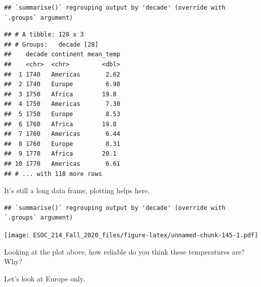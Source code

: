 \documentclass[
]{book}
\newenvironment{Shaded}{\begin{snugshade}}{\end{snugshade}}
\newcommand{\DataTypeTok}[1]{\textcolor[rgb]{0.13,0.29,0.53}{#1}}
\newcommand{\KeywordTok}[1]{\textcolor[rgb]{0.13,0.29,0.53}{\textbf{#1}}}
\newcommand{\NormalTok}[1]{#1}
\newcommand{\OperatorTok}[1]{\textcolor[rgb]{0.81,0.36,0.00}{\textbf{#1}}}
\newcommand{\OtherTok}[1]{\textcolor[rgb]{0.56,0.35,0.01}{#1}}
\newcommand{\StringTok}[1]{\textcolor[rgb]{0.31,0.60,0.02}{#1}}
\begin{document}
\begin{verbatim}
## `summarise()` regrouping output by 'decade' (override with `.groups` argument)
\end{verbatim}

\begin{verbatim}
## # A tibble: 128 x 3
## # Groups:   decade [28]
##    decade continent mean_temp
##    <chr>  <chr>         <dbl>
##  1 1740   Americas       2.62
##  2 1740   Europe         6.98
##  3 1750   Africa        19.8 
##  4 1750   Americas       7.30
##  5 1750   Europe         8.53
##  6 1760   Africa        19.8 
##  7 1760   Americas       6.44
##  8 1760   Europe         8.31
##  9 1770   Africa        20.1 
## 10 1770   Americas       6.61
## # ... with 118 more rows
\end{verbatim}

It's still a long data frame, plotting helps here.

\begin{Shaded}
\end{Shaded}

\begin{verbatim}
## `summarise()` regrouping output by 'decade' (override with `.groups` argument)
\end{verbatim}

\texttt{[image: ESOC\_214\_Fall\_2020\_files/figure-latex/unnamed-chunk-145-1.pdf]}

Looking at the plot above, how reliable do you think these temperatures are? Why?

Let's look at Europe only.

\begin{Shaded}
\end{Shaded}
\end{document}
